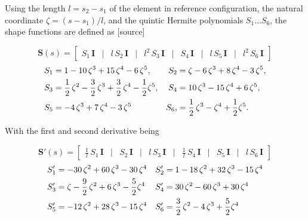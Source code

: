 Using the length $l = s_{2} - s_{1}$ of the element in reference configuration, the natural coordinate $\zeta = (s - s_{1})/l$, and the quintic Hermite polynomials $S_1 \ldots S_6$, the shape functions are defined as [source]


\begin{equation}
\boldsymbol{S}(s) =
\begin{bmatrix}
S_1\,\boldsymbol{I} & \vert & l\,S_2\,\boldsymbol{I} & \vert & l^2\,S_3\,\boldsymbol{I} & \vert & S_4\,\boldsymbol{I} & \vert & l\,S_5\,\boldsymbol{I} & \vert & l^2\,S_6\,\boldsymbol{I}
\end{bmatrix}
\end{equation}
%
\begin{align}
S_1 &= 1 - 10\,\zeta^3 + 15\,\zeta^4 - 6\,\zeta^5, & S_2 &= \zeta - 6\,\zeta^3 + 8\,\zeta^4 - 3\,\zeta^5, \notag \\
S_3 &= \frac{1}{2}\,\zeta^2 - \frac{3}{2}\,\zeta^3 + \frac{3}{2}\,\zeta^4 - \frac{1}{2}\zeta^5, & S_4 &= 10\,\zeta^3 - 15\,\zeta^4 + 6\,\zeta^5, \notag \\
S_5 &= -4\,\zeta^3 + 7\,\zeta^4 - 3\,\zeta^5 & S_6, &= \frac{1}{2}\,\zeta^3 - \zeta^4 + \frac{1}{2}\zeta^5.
\end{align}

With the first and second derivative being

\begin{equation}
\boldsymbol{S}'(s) =
\begin{bmatrix}
\frac{1}{l}\,S_1\,\boldsymbol{I} & \vert & S_2\,\boldsymbol{I} & \vert & l\,S_3\,\boldsymbol{I} & \vert & \frac{1}{l}\,S_4\,\boldsymbol{I} & \vert & S_5\,\boldsymbol{I} & \vert & l\,S_6\,\boldsymbol{I}
\end{bmatrix}
\end{equation}
%
\begin{align}
S_1' &= -30\,\zeta^2 + 60\,\zeta^3 - 30\,\zeta^4 & S_2' &= 1 - 18\,\zeta^2 + 32\,\zeta^3 - 15\,\zeta^4 \notag \\
S_3' &= \zeta - \frac{9}{2}\,\zeta^2 + 6\,\zeta^3 - \frac{5}{2}\zeta^4 & S_4' &= 30\,\zeta^2 - 60\,\zeta^3 + 30\,\zeta^4 \notag \\
S_5' &= -12\,\zeta^2 + 28\,\zeta^3 - 15\,\zeta^4 & S_6' &= \frac{3}{2}\,\zeta^2 - 4\,\zeta^3 + \frac{5}{2}\zeta^4
\end{align}

